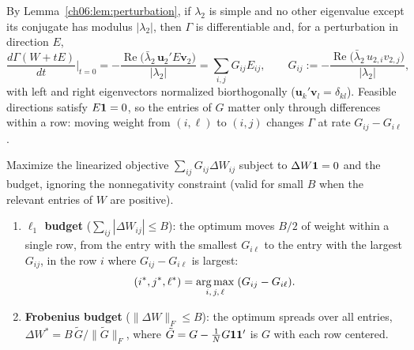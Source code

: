 \documentclass[../structural_economics_book.tex]{subfiles}
\begin{document}
By Lemma~\ref{ch06:lem:perturbation}, if $\lambda_2$ is simple and no other eigenvalue except its conjugate has modulus $|\lambda_2|$, then $\Gamma$ is differentiable and, for a perturbation in direction $E$,
\begin{equation}\label{ch15:eq:gamma_sensitivity}
\frac{d\Gamma(W + tE)}{dt}\Big|_{t=0} = -\frac{\operatorname{Re}\!\big(\bar\lambda_2\,\mathbf{u}_2'E\mathbf{v}_2\big)}{|\lambda_2|} = \sum_{i,j} G_{ij}E_{ij}, \qquad G_{ij} := -\frac{\operatorname{Re}\!\big(\bar\lambda_2\,u_{2,i}v_{2,j}\big)}{|\lambda_2|},
\end{equation}
with left and right eigenvectors normalized biorthogonally ($\mathbf{u}_k'\mathbf{v}_l = \delta_{kl}$). Feasible directions satisfy $E\mathbf{1} = 0$, so the entries of $G$ matter only through differences within a row: moving weight from $(i, \ell)$ to $(i, j)$ changes $\Gamma$ at rate $G_{ij} - G_{i\ell}$.

\begin{proposition}\label{ch15:thm:optimal_edge}
Maximize the linearized objective $\sum_{ij}G_{ij}\Delta W_{ij}$ subject to $\Delta W\mathbf{1} = 0$ and the budget, ignoring the nonnegativity constraint (valid for small $B$ when the relevant entries of $W$ are positive).
\begin{enumerate}
\item \textbf{$\ell_1$ budget} ($\sum_{ij}|\Delta W_{ij}| \leq B$): the optimum moves $B/2$ of weight within a single row, from the entry with the smallest $G_{i\ell}$ to the entry with the largest $G_{ij}$, in the row $i$ where $G_{ij} - G_{i\ell}$ is largest:
\begin{equation}\label{ch15:eq:optimal_edge}
(i^*, j^*, \ell^*) = \operatorname*{arg\,max}_{i,\,j,\,\ell}\; (G_{ij} - G_{i\ell}).
\end{equation}
\item \textbf{Frobenius budget} ($\|\Delta W\|_F \leq B$): the optimum spreads over all entries, $\Delta W^* = B\,\tilde G/\|\tilde G\|_F$, where $\tilde G = G - \frac{1}{N}G\mathbf{1}\mathbf{1}'$ is $G$ with each row centered.
\end{enumerate}
\end{proposition}
\end{document}
